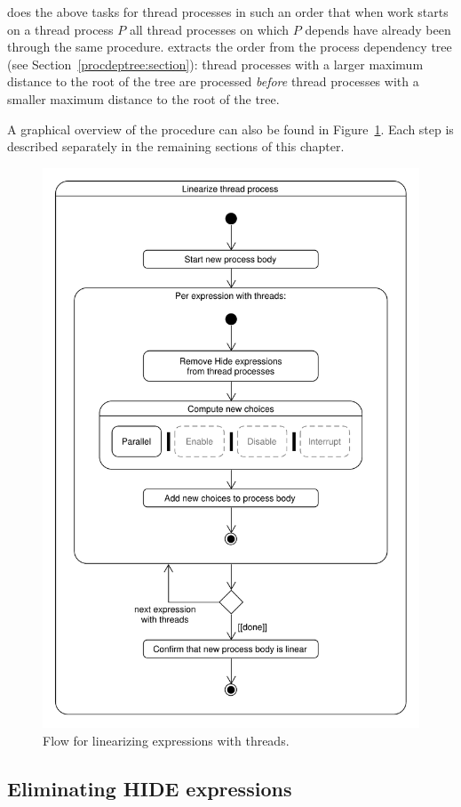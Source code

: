 \lpeq{} does the above tasks for thread processes in such an order that when work starts on a thread process $P$ all thread processes on which $P$ depends have already been through the same procedure.
\lpeq{} extracts the order from the process dependency tree (see Section~\ref{procdeptree:section}): thread processes with a larger maximum distance to the root of the tree are processed \emph{before} thread processes with a smaller maximum distance to the root of the tree.

A graphical overview of the procedure can also be found in Figure~\ref{pbranch-flow:fig}.
Each step is described separately in the remaining sections of this chapter.

\begin{figure}[!ht]
\begin{center}
\includegraphics[width=0.8\linewidth]{umlet/linearization-pbranch-flow}
\caption{Flow for linearizing expressions with threads.}
\label{pbranch-flow:fig}
\end{center}
\end{figure}

\subsection{Eliminating HIDE expressions}

